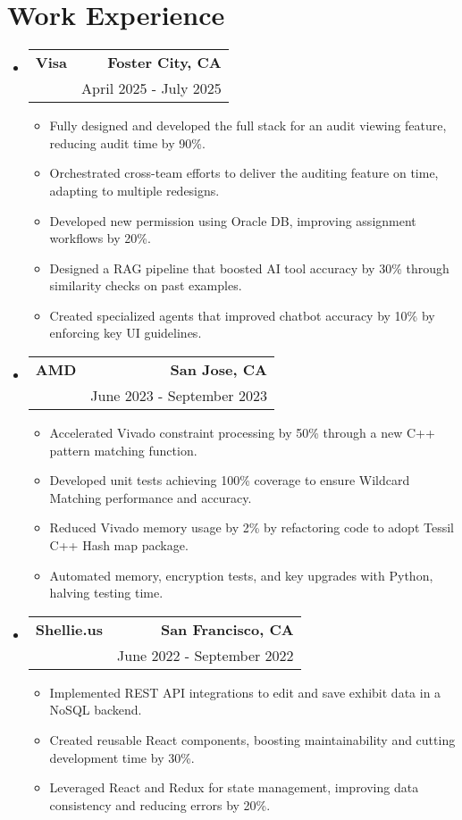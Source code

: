 \documentclass[letterpaper,11pt]{article}
\makeatletter
\newcommand{\resumeItem}[1]{
  \item\small{
    {#1 \vspace{-2pt}}
  }
}
\newcommand{\resumeSubheading}[4]{
  \vspace{-2pt}\item
    \begin{tabular*}{0.97\textwidth}[t]{l@{\extracolsep{\fill}}r}
      \textbf{#1} & #2 \\
      \text{#3} & #4 \\
    \end{tabular*}\vspace{-7pt}
}
\newcommand{\resumeSubHeadingListStart}{\begin{itemize}[leftmargin=0.15in, label={}]}
\newcommand{\resumeSubHeadingListEnd}{\end{itemize}}
\newcommand{\resumeItemListStart}{\begin{itemize}}
\newcommand{\resumeItemListEnd}{\end{itemize}\vspace{-5pt}}
\makeatother
\begin{document}
\section{\textbf{Work Experience}}
  \resumeSubHeadingListStart
    \resumeSubheading
    {Visa}{\textbf{Foster City, CA}}
    {Software Engineer, Java, Typescript, Python, SQL}{April 2025 - July 2025}
    \resumeItemListStart
        \resumeItem{Fully designed and developed the full stack for an audit viewing feature, reducing audit time by 90\%.}
        \resumeItem{Orchestrated cross-team efforts to deliver the auditing feature on time, adapting to multiple redesigns.}
        \resumeItem{Developed new permission using Oracle DB, improving assignment workflows by 20\%.}
        \resumeItem{Designed a RAG pipeline that boosted AI tool accuracy by 30\% through similarity checks on past examples.}
        \resumeItem{Created specialized agents that improved chatbot accuracy by 10\% by enforcing key UI guidelines.}
    \resumeItemListEnd
    \resumeSubheading
    {AMD}{\textbf{San Jose, CA}}
    {Software Engineer Intern, C++, Python}{June 2023 - September 2023}
    \resumeItemListStart
        \resumeItem{Accelerated Vivado constraint processing by 50\% through a new C++ pattern matching function.}
        \resumeItem{Developed unit tests achieving 100\% coverage to ensure Wildcard Matching performance and accuracy.}
        \resumeItem{Reduced Vivado memory usage by 2\% by refactoring code to adopt Tessil C++ Hash map package.}
        \resumeItem{Automated memory, encryption tests, and key upgrades with Python, halving testing time.}
    \resumeItemListEnd
    \resumeSubheading
    {Shellie.us}{\textbf{San Francisco, CA}}
    {Software Engineer Intern, React, JavaScript}{June 2022 - September 2022}
    \resumeItemListStart
        \resumeItem{Implemented REST API integrations to edit and save exhibit data in a NoSQL backend.}
        \resumeItem{Created reusable React components, boosting maintainability and cutting development time by 30\%.}
        \resumeItem{Leveraged React and Redux for state management, improving data consistency and reducing errors by 20\%.}
    \resumeItemListEnd
  \resumeSubHeadingListEnd


\end{document}
